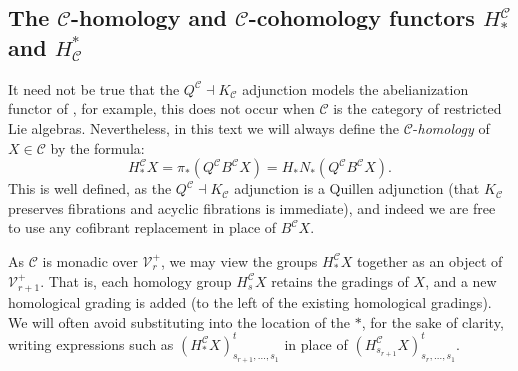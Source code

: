 \documentclass[11pt]{amsart}
\theoremstyle{plain}
\theoremstyle{definition}
\newcommand{\calC}{\mathcal{C}}
\newcommand{\calV}{\mathcal{V}}
\newcommand{\calc}{\mathcal{C}}
\theoremstyle{plain}
\newcommand{\vect}[2]{\calV^{#1}_{#2}}
\begin{document}
\begin{Conventions and notation}
\subsection{The $\calC$-homology and $\calC$-cohomology functors $H^{\calC}_*$ and $H_{\calC}^*$}

It need not be true that the $Q^\calC\dashv K_\calC$ adjunction models the abelianization functor of \cite[\S II.5]{QuillenHomAlg.pdf}, for example, this does not occur when $\calc$ is the category of restricted Lie algebras. Nevertheless, in this text we will always define the $\calC$-\emph{homology} of $X\in\calC$ by the formula:
\[H_*^{\calC}X=\pi_*(Q^\calC B^\calC X)=H_*N_*(Q^\calC B^\calC X).\]
This is well defined, as the $Q^\calC\dashv K_\calC$ adjunction is a Quillen adjunction (that $K_\calC$ preserves fibrations and acyclic fibrations is immediate), and indeed we are free to use any cofibrant replacement in place of $B^\calC X$.

As $\calC$ is monadic over $\vect{+}{r}$, we may view the groups $H_*^{\calC}X$ together as an object of $\vect{+}{r+1}$. That is, each homology group $H_s^\calC X$ retains the gradings of $X$, and a new homological grading is added (to the left of the existing homological gradings). We will often avoid substituting into the location of the $*$, for the sake of clarity, writing expressions such as $(H_*^\calC X)_{s_{r+1},\ldots,s_1}^t$ in place of $(H_{s_{r+1}}^\calC X)_{s_r,\ldots,s_1}^t$.


\end{Conventions and notation}
\end{document}
